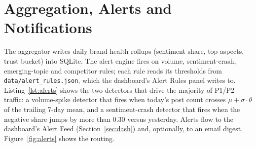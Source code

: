 \section{Aggregation, Alerts and Notifications}\label{sec:agg}
The aggregator writes daily brand-health rollups (sentiment share, top
aspects, trust bucket) into SQLite.  The alert engine fires on volume,
sentiment-crash, emerging-topic and competitor rules; each rule reads its
thresholds from \texttt{data/alert\_rules.json}, which the dashboard's
Alert Rules panel writes to.  Listing~\ref{lst:alerts} shows the two
detectors that drive the majority of P1/P2 traffic: a volume-spike detector
that fires when today's post count crosses $\mu + \sigma\!\cdot\!\theta$ of
the trailing 7-day mean, and a sentiment-crash detector that fires when
the negative share jumps by more than 0.30 versus yesterday.  Alerts flow
to the dashboard's Alert Feed (Section~\ref{sec:dash}) and, optionally, to an
email digest.  Figure~\ref{fig:alerts} shows the routing.

